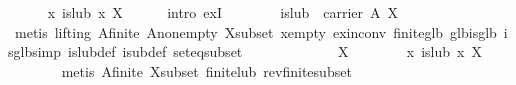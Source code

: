 \begin{isabellebody}
\ \ \ \ \isamarkupfalse%
\ {}{}x{}\ is{}lub\ x\ X{}\isanewline
\ \ \ \ \isamarkupfalse%
\ {}intro\ exI{}\isanewline
\ \ \ \ \ \ \isamarkupfalse%
\ {}is{}lub\ {}{}\ {}carrier\ A{}{}\ X{}\isanewline
\ \ \ \ \ \ \ \ \isamarkupfalse%
\ {}metis\ {}lifting{}\ A{}finite\ A{}non{}empty\ X{}subset\ x{}empty\ ex{}in{}conv\ finite{}glb\ glb{}is{}glb\ is{}glb{}simp\ is{}lub{}def\ is{}ub{}def\ set{}eq{}subset{}\isanewline
\ \ \ \ \isamarkupfalse%
\isanewline
\ \ \isamarkupfalse%
\isanewline
\ \ \ \ \isamarkupfalse%
\ {}X\ {}\ {}{}{}\isanewline
\ \ \ \ \isamarkupfalse%
\ {}{}x{}\ is{}lub\ x\ X{}\isanewline
\ \ \ \ \ \ \isamarkupfalse%
\ {}metis\ A{}finite\ X{}subset\ finite{}lub\ rev{}finite{}subset{}\isanewline

\end{isabellebody}
